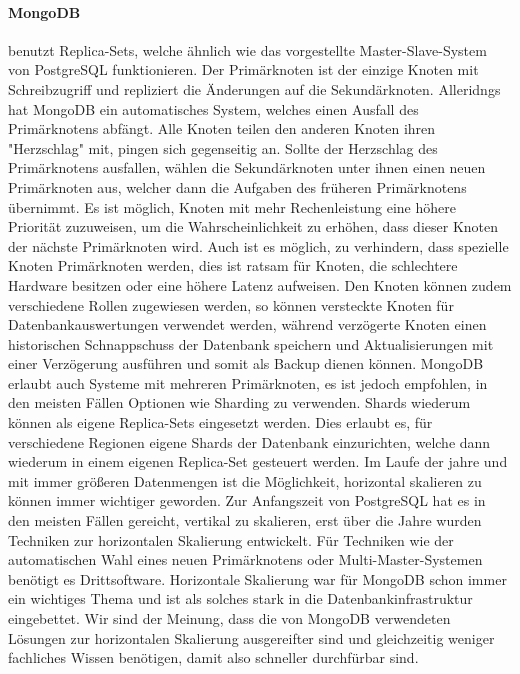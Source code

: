 \paragraph{MongoDB}
benutzt Replica-Sets, welche ähnlich wie das vorgestellte Master-Slave-System von PostgreSQL funktionieren. Der Primärknoten ist der einzige Knoten mit Schreibzugriff und repliziert die Änderungen auf die Sekundärknoten. Alleridngs hat MongoDB ein automatisches System, welches einen Ausfall des Primärknotens abfängt. Alle Knoten teilen den anderen Knoten ihren "Herzschlag" mit, pingen sich gegenseitig an. Sollte der Herzschlag des Primärknotens ausfallen, wählen die Sekundärknoten unter ihnen einen neuen Primärknoten aus, welcher dann die Aufgaben des früheren Primärknotens übernimmt. Es ist möglich, Knoten mit mehr Rechenleistung eine höhere Priorität zuzuweisen, um die Wahrscheinlichkeit zu erhöhen, dass dieser Knoten der nächste Primärknoten wird. Auch ist es möglich, zu verhindern, dass spezielle Knoten Primärknoten werden, dies ist ratsam für Knoten, die schlechtere Hardware besitzen oder eine höhere Latenz aufweisen. Den Knoten können zudem verschiedene Rollen zugewiesen werden, so können versteckte Knoten für Datenbankauswertungen verwendet werden, während verzögerte Knoten einen historischen Schnappschuss der Datenbank speichern und Aktualisierungen mit einer Verzögerung ausführen und somit als Backup dienen können. \cite{MG10}\cite{MG11}\cite{MG12}\cite{MG13} MongoDB erlaubt auch Systeme mit mehreren Primärknoten, es ist jedoch empfohlen, in den meisten Fällen Optionen wie Sharding zu verwenden. \cite{MG14}
Shards wiederum können als eigene Replica-Sets eingesetzt werden. Dies erlaubt es, für verschiedene Regionen eigene Shards der Datenbank einzurichten, welche dann wiederum in einem eigenen Replica-Set gesteuert werden.
Im Laufe der jahre und mit immer größeren Datenmengen ist die Möglichkeit, horizontal skalieren zu können immer wichtiger geworden. Zur Anfangszeit von PostgreSQL hat es in den meisten Fällen gereicht, vertikal zu skalieren, erst über die Jahre wurden Techniken zur horizontalen Skalierung entwickelt. Für Techniken wie der automatischen Wahl eines neuen Primärknotens oder Multi-Master-Systemen benötigt es Drittsoftware. Horizontale Skalierung war für MongoDB schon immer ein wichtiges Thema und ist als solches stark in die Datenbankinfrastruktur eingebettet. Wir sind der Meinung, dass die von MongoDB verwendeten Lösungen zur horizontalen Skalierung ausgereifter sind und gleichzeitig weniger fachliches Wissen benötigen, damit also schneller durchfürbar sind.

